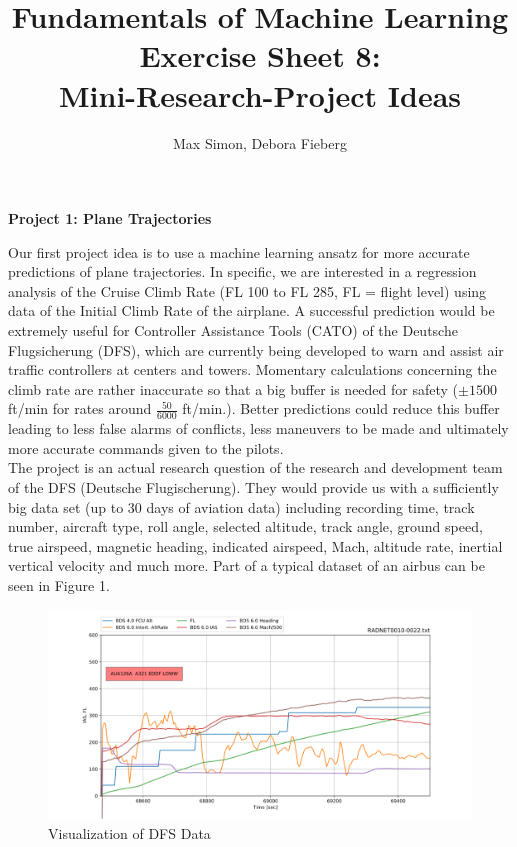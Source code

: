 \documentclass[11pt,a4paper]{article}
\title{Fundamentals of Machine Learning \\ Exercise Sheet 8: \\ Mini-Research-Project Ideas}
\author{Max Simon, Debora Fieberg}
\begin{document}
	\maketitle
	
	\centerline{\large{\textbf{Project 1: Plane Trajectories}}}
	\bigskip
	Our first project idea is to use a machine learning ansatz for more accurate predictions of plane trajectories.	
	In specific, we are interested in a regression analysis of the Cruise Climb Rate (FL 100 to FL 285, FL = flight level) using data of the Initial Climb Rate of the airplane. A successful prediction would be extremely useful for Controller Assistance Tools (CATO) of the Deutsche Flugsicherung (DFS), which are currently being developed to warn and assist air traffic controllers at centers and towers. Momentary calculations concerning the climb rate are rather inaccurate so that a big buffer is needed for safety ($\pm 1500$ ft/min for rates around $\frac{50}{6000}$ ft/min.). Better predictions could reduce this buffer leading to less false alarms of conflicts, less maneuvers to be made and ultimately more accurate commands given to the pilots. \\
	 
	The project is an actual research question of the research and development team of the DFS (Deutsche Flugischerung). They would provide us with a sufficiently big data set (up to 30 days of aviation data) including recording time, track number, aircraft type, roll angle, selected altitude, track angle, ground speed, true airspeed, magnetic heading, indicated airspeed, Mach, altitude rate, inertial vertical velocity and much more. Part of a typical dataset of an airbus can be seen in Figure 1. \\
	
	\begin{figure} 
		\centering
		\includegraphics[width=1.0\textwidth]{AUA126A.pdf}
		\caption{Visualization of DFS Data}	
	\end{figure}
	
\end{document}
